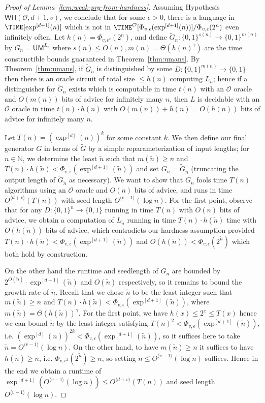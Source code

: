 \documentclass[11pt]{article}
\newcommand{\B}{\{0,1\}}
\newcommand{\od}[1]{O^{\langle #1 \rangle}}
\newcommand{\semi}[2]{\Phi_{#1,#2}}
\newcommand{\WH}{\mathsf{WH}}
\begin{document}
\begin{proof}[Proof of Lemma~\ref{lem:weak-prg-from-hardness}]
Assuming Hypothesis $\WH(\mathcal{O},d+1,v)$, we conclude that for some $\epsilon > 0$, there is a language in $\TIME[\exp^{[d+1]}(n)]$ which is not in $\TIME^{\mathcal{O}}[\semi{v}{\epsilon}(\exp^{[d+1]}(n))]/\semi{v}{\epsilon}(2^n)$ even infinitely often. Let $h(n) = \semi{v}{\epsilon^2}(2^n)$, and define $\tilde{G}_n: \B^{s(n)} \to \B^{m(n)}$ by $G_n = \mathsf{UM}^{L_n}$ where $s(n) \leq O(n), m(n) = \Theta( h(n)^\gamma)$ are the time constructible bounds guaranteed in Theorem~\ref{thm:umans}. By Theorem~\ref{thm:umans}, if $\tilde{G}_n$ is distinguished by some $D: \B^{m(n)} \to \B$ then there is an oracle circuit of total size $\leq h(n)$ computing $L_n$; hence if a distinguisher for $\tilde{G}_n$ exists which is computable in time $t(n)$ with an $\mathcal{O}$ oracle and $O(m(n))$ bits of advice for infinitely many $n$, then $L$ is decidable with an $\mathcal{O}$ oracle in time $t(n) \cdot h(n)$ with $O(m(n)) + h(n) = O(h(n))$ bits of advice for infinitely many $n$.

Let $T(n) = (\exp^{[d]}(n))^{k}$ for some constant $k$. We then define our final generator $G$ in terms of $\tilde{G}$ by a simple reparameterization of input lengths; for $n \in \mathbb{N}$, we determine the least $\tilde{n}$ such that $m(\tilde{n}) \geq n$ and  $T(n) \cdot h(\tilde{n}) < \semi{v}{\epsilon}(\exp^{[d+1]}(\tilde{n}))$
and set $G_n = \tilde{G}_{\tilde{n}}$ (truncating the output length of $\tilde{G}_{\tilde{n}}$ as necessary). 
We want to show that $G_n$ fools time $T(n)$ algorithms using an $\mathcal{O}$ oracle and $O(n)$ bits of advice, and runs in time $\od{d+v}(T(n))$ with seed length $\od{v-1}(\log n)$. For the first point, observe that for any $D: \B^n \to \B$ running in time $T(n)$ with $O(n)$ bits of advice, we obtain a computation of $L_{\tilde{n}}$ running in time $T(n) \cdot h(\tilde{n}) $ time with $O(h(\tilde{n}))$ bits of advice, which contradicts our hardness assumption provided $T(n) \cdot h(\tilde{n}) < \semi{v}{\epsilon}(\exp^{[d+1]}(\tilde{n}))$ and $O(h(\tilde{n})) < \semi{v}{\epsilon}(2^{\tilde{n}})$ which both hold by construction.

On the other hand the runtime and seedlength of $G_n$ are bounded by $2^{O(\tilde{n})} \cdot \exp^{[d+1]}(\tilde{n})$ and $O(\tilde{n})$ respectively, so it remains to bound the growth rate of $\tilde{n}$. Recall that we chose $\tilde{n}$ to be the least integer such that $m(\tilde{n}) \geq n$ and  $T(n) \cdot h(\tilde{n}) < \semi{v}{\epsilon}(\exp^{[d+1]}(\tilde{n}))$, where $m(\tilde{n}) = \Theta(h(\tilde{n}))^\gamma$. For the first point, we have $h(x) \leq 2^{x} \leq T(x)$ hence we can bound $\tilde{n}$ by the least integer satisfying $T(n)^2 < \semi{v}{\epsilon}(\exp^{[d+1]}( \tilde{n}))$, i.e. $(\exp^{[d]}(n))^{2k} < \semi{v}{\epsilon}(\exp^{[d+1]}( \tilde{n}))$, so it suffices here to take $\tilde{n} = \od{v-1}(\log n)$. On the other hand, to have $m(\tilde{n}) \geq n$ it suffices to have $h(\tilde{n}) \geq n$, i.e. $\semi{v}{\epsilon^2}(2^{\tilde{n}}) \geq n$, so setting $\tilde{n} \leq \od{v-1}(\log n)$ suffices. Hence in the end we obtain a runtime of $\exp^{[d+1]}(\od{v-1}(\log n)) \leq \od{d+v}(T(n))$ and seed length $\od{v-1}(\log n)$. 


\end{proof}
\end{document}
